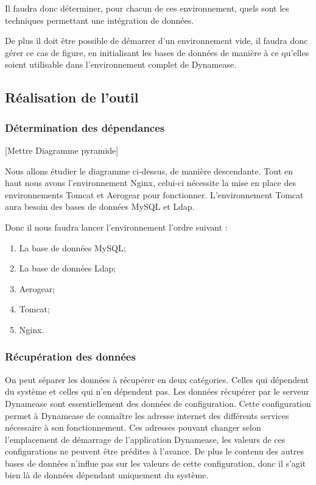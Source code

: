 Il faudra donc déterminer, pour chacun de ces environnement, quels sont les techniques permettant une intégration de données.

De plus il doit être possible de démarrer d'un environnement vide, il faudra donc gérer ce cas de figure, en initialisant les bases de données de manière à ce qu'elles soient utilisable dans l'environnement complet de Dynamease.

\subsection{Réalisation de l'outil}

\subsubsection{Détermination des dépendances}

[Mettre Diagramme pyramide]

Nous allons étudier le diagramme ci-dessus, de manière descendante. Tout en haut nous avons l'environnement Nginx, celui-ci nécessite la mise en place des environnements Tomcat et Aerogear pour fonctionner. L'environnement Tomcat aura besoin des bases de données MySQL et Ldap. 

Donc il nous faudra lancer l'environnement l'ordre suivant :

\begin{enumerate}
	\item La base de données MySQL;
	\item La base de données Ldap;
	\item Aerogear;
	\item Tomcat;
	\item Nginx.
\end{enumerate}

\subsubsection{Récupération des données}

On peut séparer les données à récupérer en deux catégories. Celles qui dépendent du système et celles qui n'en dépendent pas. Les données récupérer par le serveur Dynamease sont essentiellement des données de configuration. Cette configuration permet à Dynamease de connaître les adresse internet des différents services nécessaire à son fonctionnement. Ces adresses pouvant changer selon l'emplacement de démarrage de l'application Dynamease, les valeurs de ces configurations ne peuvent être prédites à l'avance. De plus le contenu des autres bases de données n'influe pas sur les valeurs de cette configuration, donc il s'agit bien là de données dépendant uniquement du système. 

